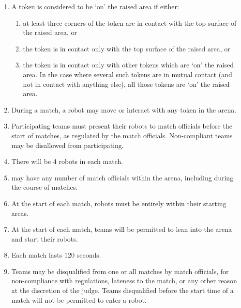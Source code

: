 \begin{enumerate}
\begin{enumerate}
    \end{enumerate}
  \item A token is considered to be `on' the raised area if either:
    \begin{enumerate}
      \item at least three corners of the token are in contact with the top
            surface of the raised area, or
      \item the token is in contact only with the top surface of the raised area, or
      \item the token is in contact only with other tokens which are `on' the raised area.
            In the case where several such tokens are in mutual contact (and not in
            contact with anything else), all those tokens are `on' the raised area.
    \end{enumerate}
  \item During a match, a robot may move or interact with any token in the arena.
  \item Participating teams must present their robots to match officials before
        the start of matches, as regulated by the match officials. Non-compliant
        teams may be disallowed from participating.
  \item There will be 4 robots in each match.
  \item \org may have any number of match officials within the arena, including
        during the course of matches.
  \item At the start of each match, robots must be entirely within their
        starting areas.
  \item At the start of each match, teams will be permitted to lean into the
        arena and start their robots.
  \item Each match lasts $120$ seconds.
  \item Teams may be disqualified from one or all matches by match officials,
        for non-compliance with regulations, lateness to the match, or any other
        reason at the discretion of the judge. Teams disqualified before the
        start time of a match will not be permitted to enter a robot.
\end{enumerate}
